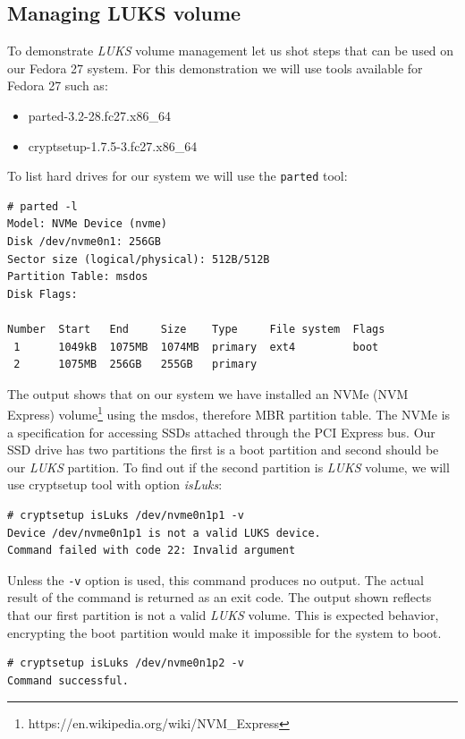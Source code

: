 \subsection{Managing LUKS volume}\label{manageLUKS}

To demonstrate {\it LUKS} volume management let us shot steps that can be used on our Fedora 27 system.
For this demonstration we will use tools available for Fedora 27 such as:\\
\begin{itemize}
    \item parted-3.2-28.fc27.x86\_64
    \item cryptsetup-1.7.5-3.fc27.x86\_64
\end{itemize}
To list hard drives for our system we will use the {\tt parted} tool:
\begin{lstlisting}[columns=fixed,basicstyle=\ttfamily\footnotesize,tabsize=4,backgroundcolor=\color{yellow!10}]
# parted -l
Model: NVMe Device (nvme)
Disk /dev/nvme0n1: 256GB
Sector size (logical/physical): 512B/512B
Partition Table: msdos
Disk Flags:

Number  Start   End     Size    Type     File system  Flags
 1      1049kB  1075MB  1074MB  primary  ext4         boot
 2      1075MB  256GB   255GB   primary
\end{lstlisting}
The output shows that on our system we have installed an NVMe (NVM Express) volume\footnote{https://en.wikipedia.org/wiki/NVM\_Express} using the msdos, therefore MBR partition table.
The NVMe is a specification for accessing SSDs attached through the PCI Express bus.
Our SSD drive has two partitions the first is a boot partition and second should be our {\it LUKS} partition.
To find out if the second partition is {\it LUKS} volume, we will use cryptsetup tool with option {\it isLuks}:
\begin{lstlisting}[columns=fixed,basicstyle=\ttfamily\footnotesize,tabsize=4,backgroundcolor=\color{yellow!10}]
# cryptsetup isLuks /dev/nvme0n1p1 -v
Device /dev/nvme0n1p1 is not a valid LUKS device.
Command failed with code 22: Invalid argument
\end{lstlisting}
Unless the {\tt -v} option is used, this command produces no output.
The actual result of the command is returned as an exit code.
The output shown reflects that our first partition is not a valid {\it LUKS} volume.
This is expected behavior, encrypting the boot partition would make it impossible for the system to boot.
\begin{lstlisting}[columns=fixed,basicstyle=\ttfamily\footnotesize,tabsize=4,backgroundcolor=\color{yellow!10}]
# cryptsetup isLuks /dev/nvme0n1p2 -v
Command successful.
\end{lstlisting}
